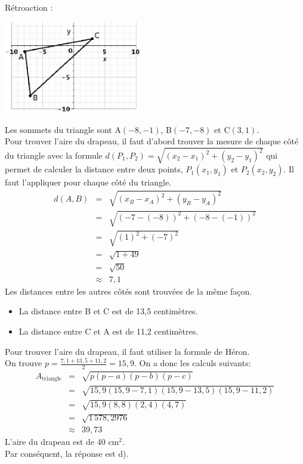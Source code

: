 \documentclass[letterpaper, 12pt]{article}
\begin{document}
R\'etroaction :\\
\begin{center}
 \includegraphics[width=6cm,bb=14 14 406 276]{Q2486.eps}
\end{center}
Les sommets du triangle sont A$(-8, -1)$, B$(-7, -8)$ et C$(3, 1)$.\\
Pour trouver l'aire du drapeau, il faut d'abord trouver la mesure de chaque c\^ot\'e du triangle avec la formule $d(P_{1}, P_{2})=\sqrt{(x_{2}-x_{1})^{2}+(y_{2}-y_{1})^{2}}$ qui permet de calculer la distance entre deux points, $P_{1}(x_{1}, y_{1})$ et $P_{2}(x_{2}, y_{2})$. Il faut l'appliquer pour chaque c\^ot\'e du triangle.
\begin{eqnarray*}
 d(A, B)&=&\sqrt{(x_{B}-x_{A})^{2}+(y_{B}-y_{A})^{2}}\\
&=&\sqrt{(-7-(-8))^{2}+(-8-(-1))^{2}}\\
&=&\sqrt{(1)^{2}+(-7)^{2}}\\
&=&\sqrt{1+49}\\
&=&\sqrt{50}\\
&\approx&7,1
\end{eqnarray*}
Les distances entre les autres c\^ot\'es sont trouv\'ees de la m\^eme fa\c con.
\begin{itemize}
 \item La distance entre B et C est de 13,5 centim\`etres.
\item La distance entre C et A est de 11,2 centim\`etres.\\
\end{itemize}
Pour trouver l'aire du drapeau, il faut utiliser la formule de H\'eron.\\
On trouve $p=\frac{7,1+13,5+11,2}{2}=15,9$. On a donc les calculs suivants:
 \begin{eqnarray*}
A_{\textrm{triangle}}&=&\sqrt{p(p-a)(p-b)(p-c)}\\
&=&\sqrt{15,9(15,9-7,1)(15,9-13,5)(15,9-11,2)}\\
&=&\sqrt{15,9(8,8)(2,4)(4,7)}\\
&=&\sqrt{1\,578,2976}\\
&\approx&39,73
\end{eqnarray*}
L'aire du drapeau est de 40 cm$^{2}$.\\
Par cons\'equent, la r\'eponse est d).\\
\end{document}
